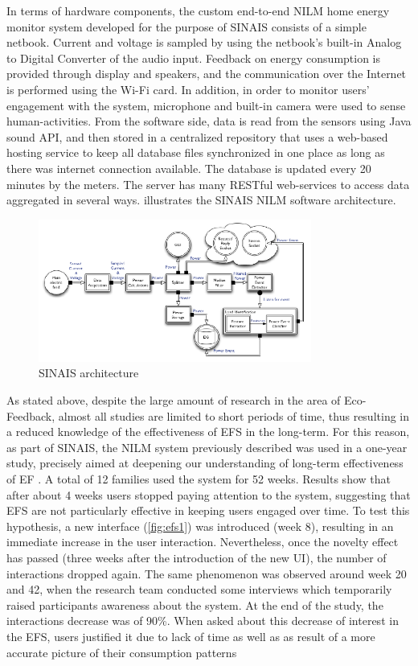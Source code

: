  In terms of hardware components, the custom end-to-end \ac{NILM} home energy monitor system developed for the purpose of \ac{SINAIS} consists of a simple netbook. Current and voltage is sampled by using the netbook’s built-in Analog to Digital Converter of the audio input. Feedback on energy consumption is provided through display and speakers, and the communication over the Internet is performed using the Wi-Fi card. In addition, in order to monitor users’ engagement with the system, microphone and built-in camera were used to sense human-activities.  From the software side, data is read from the sensors using Java sound API, and then stored in a centralized repository that uses a web-based hosting service to keep all database files synchronized in one place as long as there was internet connection available. The database is updated every 20 minutes by the meters. The server has many RESTful web-services to access data aggregated in several ways.   illustrates the SINAIS NILM software architecture.
 
 \begin{figure}[h]
\centering
\includegraphics[width=0.8\textwidth]{./Images/sinais}
\caption{\ac{SINAIS} architecture}
\label{fig:sinais}
\end{figure}


As stated above, despite the large amount of research in the area of Eco-Feedback, almost all studies are limited to short periods of time, thus resulting in a reduced knowledge of the effectiveness of \ac{EFS} in the long-term. For this reason, as part of \ac{SINAIS}, the \ac{NILM} system previously described was used in a one-year study, precisely aimed at deepening our understanding of long-term effectiveness of \ac{EF} \cite{Pereira2013}. A total of 12 families used the system for 52 weeks. Results show that after about 4 weeks users stopped paying attention to the system, suggesting that \ac{EFS} are not particularly effective in keeping users engaged over time. To test this hypothesis, a new interface (\cref{fig:efs1}) was introduced (week 8), resulting in an immediate increase in the user interaction. Nevertheless, once the novelty effect has passed (three weeks after the introduction of the new \ac{UI}), the number of interactions dropped again. The same phenomenon was observed around week 20 and 42, when the research team conducted some interviews which temporarily raised participants awareness about the system.
At the end of the study, the interactions decrease was of 90\%. When asked about this decrease of interest in the \ac{EFS}, users justified it due to lack of time as well as as result of a more accurate picture of their consumption patterns


